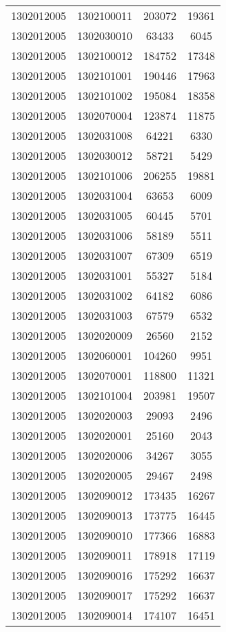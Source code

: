 \begin{longtable}[h]{llcc}
		1302012005 & 1302100011 & 203072 & 19361\\
		1302012005 & 1302030010 & 63433 & 6045\\
		1302012005 & 1302100012 & 184752 & 17348\\
		1302012005 & 1302101001 & 190446 & 17963\\
		1302012005 & 1302101002 & 195084 & 18358\\
		1302012005 & 1302070004 & 123874 & 11875\\
		1302012005 & 1302031008 & 64221 & 6330\\
		1302012005 & 1302030012 & 58721 & 5429\\
		1302012005 & 1302101006 & 206255 & 19881\\
		1302012005 & 1302031004 & 63653 & 6009\\
		1302012005 & 1302031005 & 60445 & 5701\\
		1302012005 & 1302031006 & 58189 & 5511\\
		1302012005 & 1302031007 & 67309 & 6519\\
		1302012005 & 1302031001 & 55327 & 5184\\
		1302012005 & 1302031002 & 64182 & 6086\\
		1302012005 & 1302031003 & 67579 & 6532\\
		1302012005 & 1302020009 & 26560 & 2152\\
		1302012005 & 1302060001 & 104260 & 9951\\
		1302012005 & 1302070001 & 118800 & 11321\\
		1302012005 & 1302101004 & 203981 & 19507\\
		1302012005 & 1302020003 & 29093 & 2496\\
		1302012005 & 1302020001 & 25160 & 2043\\
		1302012005 & 1302020006 & 34267 & 3055\\
		1302012005 & 1302020005 & 29467 & 2498\\
		1302012005 & 1302090012 & 173435 & 16267\\
		1302012005 & 1302090013 & 173775 & 16445\\
		1302012005 & 1302090010 & 177366 & 16883\\
		1302012005 & 1302090011 & 178918 & 17119\\
		1302012005 & 1302090016 & 175292 & 16637\\
		1302012005 & 1302090017 & 175292 & 16637\\
		1302012005 & 1302090014 & 174107 & 16451\\

\end{longtable}
